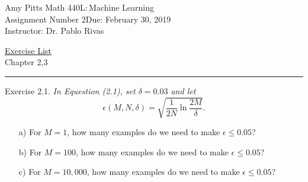 \documentclass[12pt]{article}
\newcommand{\myname}{Amy Pitts} %
\newcommand{\duedate}{February 30, 2019} %
\newcommand{\courseno}{440L}      %
\newcommand{\coursename}{Machine Learning}    %
\newcommand{\instructorname}{Instructor: Dr. Pablo Rivas} %
\newcommand{\assignumber}{2}   %
\newcommand{\exerciselist}{Chapter 2,3}      %
\newcommand{\firstpageinfo}  
    {\textsf{\large\myname}    \hfill     Math \courseno{:}\,\coursename \\
  Assignment Number \assignumber \hfill  Due:  \duedate \\
  \instructorname}
\newenvironment{exercise}[1][]{%
  \bigskip                          %
  \noindent \textsf{Exercise #1.}\slshape }{}
\begin{document}
\thispagestyle{empty}

\noindent\firstpageinfo
\begin{center} \underline{\textsf{Exercise List}}\\[5pt] \exerciselist \end{center}
\medskip\hrule


\begin{exercise}[2.1] %
In Equestion (2.1), set $\delta=0.03$ and let 
\begin{equation*}
  \epsilon(M,N,\delta) = \sqrt{\frac{1}{2N}\ln\frac{2M}{\delta}}.
\end{equation*}
\begin{enumerate}
  \item[a)] For $M=1$, how many examples do we need to make $\epsilon \leq 0.05$?
  \item[b)] For $M=100$, how many examples do we need to make $\epsilon \leq 0.05$?
  \item[c)] For $M=10,000$, how many examples do we need to make $\epsilon \leq 0.05$? 
\end{enumerate}
\end{exercise}
  
\end{document}
